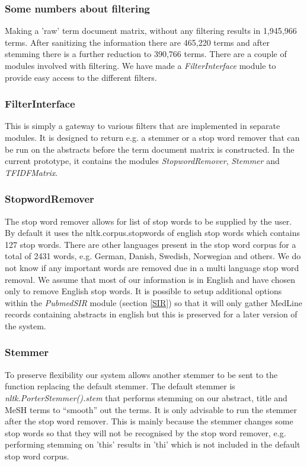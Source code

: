 
\subsubsection{Some numbers about filtering}
Making a 'raw' term document matrix, without any filtering results in
1,945,966 terms. After sanitizing the information there are 465,220 terms 
and after stemming there is a further reduction to 390,766 terms.
There are a couple of modules involved with filtering. We have made a
\textit{FilterInterface} module to provide easy access to the different
filters.

\subsubsection{FilterInterface}
This is simply a gateway to various filters that are implemented in
separate modules. It is designed to return e.g. a stemmer or a stop
word remover that can be run on the abstracts before the term document
matrix is constructed. In the current prototype, it contains the
modules \textit{StopwordRemover}, \textit{Stemmer} and
\textit{TFIDFMatrix}.

\subsubsection{StopwordRemover}
The stop word remover allows for list of stop words to be supplied by
the user. By default it uses the nltk.corpus.stopwords of english stop
words which contains 127 stop words. There are other languages present
in the stop word corpus for a total of 2431 words, e.g. German,
Danish, Swedish, Norwegian and others. We do not know if any important
words are removed due in a multi language stop word removal. We assume
that most of our information is in English and have chosen only to
remove English stop words. It is possible to setup additional options
within the \textit{PubmedSIR} module (section \ref{SIR}) so that it will
only gather MedLine records containing abstracts in english but this
is preserved for a later version of the system.

\subsubsection{Stemmer}
To preserve flexibility our system allows another stemmer to be sent
to the function replacing the default stemmer. The default stemmer is
\textit{nltk.PorterStemmer().stem} that performs stemming on our
abstract, title and MeSH terms to ``smooth'' out the terms. It is only
advisable to run the stemmer after the stop word remover. This is
mainly because the stemmer changes some stop words so that they will
not be recognised by the stop word remover, e.g. performing stemming
on 'this' results in 'thi' which is not included in the default stop
word corpus.

